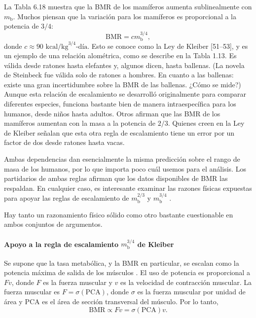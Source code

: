 \documentclass[12pt]{book}
\begin{document}
La Tabla 6.18 muestra que la BMR de los mamíferos aumenta sublinealmente con $m_{\text{b}}$. Muchos piensan que la variación para los mamíferos es proporcional a la potencia de $3/4$:
\begin{equation}
\text{BMR} = c m_{\text{b}}^{3/4},
\label{eq:619}
\end{equation}
donde $c \approx 90\text{ kcal/kg}^{3/4}\text{-día}$. Esto se conoce como la Ley de Kleiber [51--53], y es un ejemplo de una relación alométrica, como se describe en la Tabla 1.13. Es válida desde ratones hasta elefantes y, algunos dicen, hasta ballenas. (La novela de Steinbeck fue válida solo de ratones a hombres. En cuanto a las ballenas: existe una gran incertidumbre sobre la BMR de las ballenas. ¿Cómo se mide?) Aunque esta relación de escalamiento se desarrolló originalmente para comparar diferentes especies, funciona bastante bien de manera intraespecífica para los humanos, desde niños hasta adultos. Otros afirman que las BMR de los mamíferos aumentan con la masa a la potencia de $2/3$. Quienes creen en la Ley de Kleiber señalan que esta otra regla de escalamiento tiene un error por un factor de dos desde ratones hasta vacas.

Ambas dependencias dan esencialmente la misma predicción sobre el rango de masa de los humanos, por lo que importa poco cuál usemos para el análisis. Los partidarios de ambas reglas afirman que los datos disponibles de BMR las respaldan. En cualquier caso, es interesante examinar las razones físicas expuestas para apoyar las reglas de escalamiento de $m_{\text{b}}^{2/3}$ y $m_{\text{b}}^{3/4}$ \cite{27,42}.

Hay tanto un razonamiento físico sólido como otro bastante cuestionable en ambos conjuntos de argumentos.

\paragraph*{Apoyo a la regla de escalamiento $m_{\text{b}}^{3/4}$ de Kleiber}

Se supone que la tasa metabólica, y la BMR en particular, se escalan como la potencia máxima de salida de los músculos \cite{65,66}. El uso de potencia es proporcional a $Fv$, donde $F$ es la fuerza muscular y $v$ es la velocidad de contracción muscular. La fuerza muscular es $F = \sigma(\text{PCA})$, donde $\sigma$ es la fuerza muscular por unidad de área y $\text{PCA}$ es el área de sección transversal del músculo. Por lo tanto,
\begin{equation}
\text{BMR} \propto Fv = \sigma(\text{PCA})v.
\label{eq:620}
\end{equation}
\end{document}

